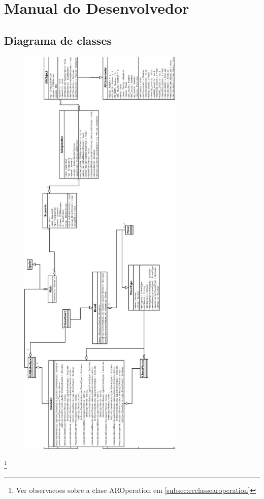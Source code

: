 \documentclass[a4paper,12pt]{book}
\begin{document}
\part{Manual do Desenvolvedor}
\label{part:manualdodesenvolvedor}
	\chapter{Diagrama de classes}
	\label{ch:diagramadeclasses}
	\begin{figure}[H]
	\centering
	\includegraphics[width=0.7\textwidth, height=0.7\textheight]{diagramadeclasses}
	\end{figure}
	\footnote{Ver observacoes sobre a clase AROperation em
			  \ref{subsec:ecclassearoperation}
			 }
\end{document}
